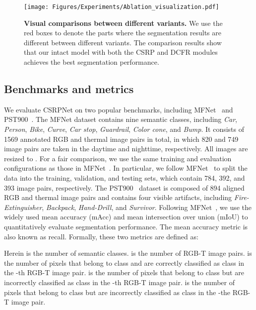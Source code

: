 \begin{figure}[t]
\centering
\texttt{[image: Figures/Experiments/Ablation\_visualization.pdf]} 
\caption{\textbf{Visual comparisons between different variants.} We use the red boxes to denote the parts where the segmentation results are different between different variants. The comparison results show that our intact model with both the CSRP and DCFR modules achieves the best segmentation performance.}
\label{Fig: ablation_visualization}
\end{figure}

\subsection{Benchmarks and metrics}
We evaluate CSRPNet on two popular benchmarks, including MFNet~\cite{MFNet} and PST900~\cite{PSTNet}. The MFNet dataset contains nine semantic classes, including \emph{Car}, \emph{Person}, \emph{Bike}, \emph{Curve}, \emph{Car stop}, \emph{Guardrail}, \emph{Color cone}, and \emph{Bump}. It consists of 1569 annotated RGB and thermal image pairs in total, in which 820 and 749 image pairs are taken in the daytime and nighttime, respectively. 
All images are resized to . For a fair comparison, we use the same training and evaluation configurations as those in MFNet~\cite{MFNet}. In particular, we follow MFNet~\cite{MFNet} to split the data into the training, validation, and testing sets, which contain 784, 392, and 393 image pairs, respectively. The PST900~\cite{PSTNet} dataset is composed of 894 aligned RGB and thermal image pairs and contains four visible artifacts, including \emph{Fire-Extinguisher}, \emph{Backpack}, \emph{Hand-Drill}, and \emph{Survivor}.
Following MFNet~\cite{MFNet}, we use the widely used mean accuracy (mAcc) and mean intersection over union (mIoU) to quantitatively evaluate segmentation performance. The mean accuracy metric is also known as recall. Formally, these two metrics are defined as:

Herein  is the number of semantic classes.  is the number of RGB-T image pairs.  is the number of pixels that belong to class  and are correctly classified as class  in the -th RGB-T image pair.  is the number of pixels that belong to class  but are incorrectly classified as class  in the -th RGB-T image pair.  is the number of pixels that belong to class  but are incorrectly classified as class  in the -the RGB-T image pair. 

